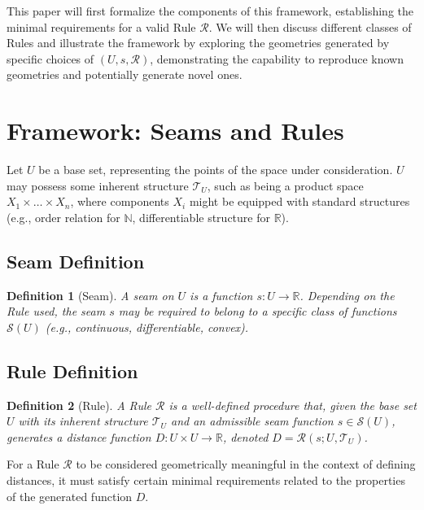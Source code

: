 \documentclass[twoside,twocolumn]{article}
\newtheorem{definition}{Definition}[subsection] %
\begin{document}
This paper will first formalize the components of this framework, establishing the minimal requirements for a valid Rule $\mathcal{R}$. We will then discuss different classes of Rules and illustrate the framework by exploring the geometries generated by specific choices of $(U, s, \mathcal{R})$, demonstrating the capability to reproduce known geometries and potentially generate novel ones.


\section{Framework: Seams and Rules}

Let $U$ be a base set, representing the points of the space under consideration. $U$ may possess some inherent structure $\mathcal{T}_U$, such as being a product space $X_1 \times \dots \times X_n$, where components $X_i$ might be equipped with standard structures (e.g., order relation for $\mathbb{N}$, differentiable structure for $\mathbb{R}$).

\setcounter{subsection}{0} %
\subsection{Seam Definition} %
\begin{definition}[Seam]
A \emph{seam} on $U$ is a function $s: U \to \mathbb{R}$. Depending on the Rule used, the seam $s$ may be required to belong to a specific class of functions $\mathcal{S}(U)$ (e.g., continuous, differentiable, convex).
\end{definition}

\subsection{Rule Definition} %
\begin{definition}[Rule]
A \emph{Rule} $\mathcal{R}$ is a well-defined procedure that, given the base set $U$ with its inherent structure $\mathcal{T}_U$ and an admissible seam function $s \in \mathcal{S}(U)$, generates a distance function $D: U \times U \to \mathbb{R}$, denoted $D = \mathcal{R}(s; U, \mathcal{T}_U)$.
\end{definition}

For a Rule $\mathcal{R}$ to be considered geometrically meaningful in the context of defining distances, it must satisfy certain minimal requirements related to the properties of the generated function $D$.
\end{document}
